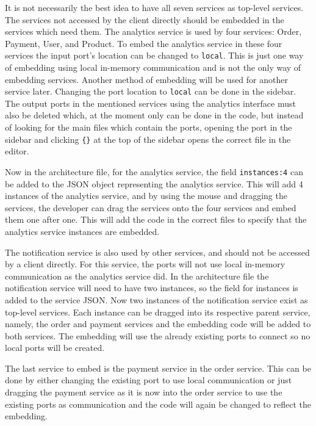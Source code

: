 It is not necessarily the best idea to have all seven services as top-level services. The services not accessed by the client directly should be embedded in the services which need them.
The analytics service is used by four services: Order, Payment, User, and Product. To embed the analytics service in these four services the input port's location can be changed to \texttt{local}. This is just one way of embedding using local in-memory communication and is not the only way of embedding services. Another method of embedding will be used for another service later.
Changing the port location to \texttt{local} can be done in the sidebar.
The output ports in the mentioned services using the analytics interface must also be deleted which, at the moment only can be done in the code, but instead of looking for the main files which contain the ports,
opening the port in the sidebar and clicking \texttt{\{\}} at the top of the sidebar opens the correct file in the editor.

Now in the architecture file, for the analytics service, the field \texttt{instances:4} can be added to the JSON object representing the analytics service. This will add 4 instances of the analytics service, and by using the mouse and dragging the services, the developer can 
drag the services onto the four services and embed them one after one. This will add the code in the correct files to specify that the analytics service instances are embedded.

The notification service is also used by other services, and should not be accessed by a client directly. For this service, the ports will not use local in-memory communication as the analytics service did.
In the architecture file the notification service will need to have two instances, so the field for instances is added to the service JSON. Now two instances of the notification service exist as top-level services. Each instance can be dragged into its respective
parent service, namely, the order and payment services and the embedding code will be added to both services. The embedding will use the already existing ports to connect so no local ports will be created.

The last service to embed is the payment service in the order service. This can be done by either changing the existing port to use local communication or just dragging the payment service
as it is now into the order service to use the existing ports as communication and the code will again be changed to reflect the embedding.

